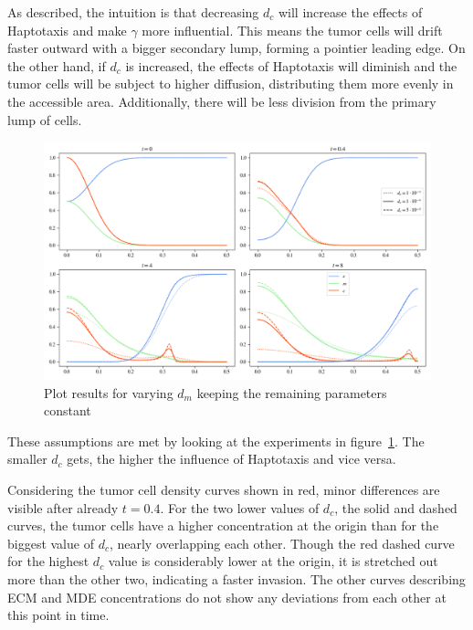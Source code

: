 As described, the intuition is that decreasing $d_c$ will increase the effects of Haptotaxis and make $\gamma$ more influential. This means the tumor cells will drift faster outward with a bigger secondary lump, forming a pointier leading edge. On the other hand, if $d_c$ is increased, the effects of Haptotaxis will diminish and the tumor cells will be subject to higher diffusion, distributing them more evenly in the accessible area. Additionally, there will be less division from the primary lump of cells. 
\begin{figure}[h!]
 \centering
 \includegraphics[width=\textwidth]{resources/images/dc_variation.png}
 \caption{Plot results for varying $d_m$ keeping the remaining parameters constant}
 \label{fig:dc_variation}
\end{figure}
These assumptions are met by looking at the experiments in figure~\ref{fig:dc_variation}. The smaller $d_c$ gets, the higher the influence of Haptotaxis and vice versa.

Considering the tumor cell density curves shown in red, minor differences are visible after already $t=0.4$. For the two lower values of $d_c$, the solid and dashed curves, the tumor cells have a higher concentration at the origin than for the biggest value of $d_c$, nearly overlapping each other. Though the red dashed curve for the highest $d_c$ value is considerably lower at the origin, it is stretched out more than the other two, indicating a faster invasion. The other curves describing ECM and MDE concentrations do not show any deviations from each other at this point in time.

